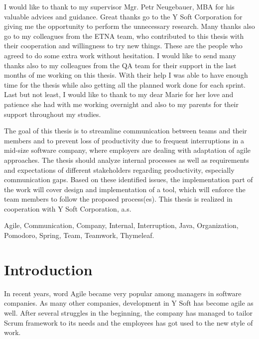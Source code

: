 \documentclass[11pt,singleside]{myfithesis2}
\begin{document}
\FrontMatter
\ThesisTitlePage
\begin{ThesisDeclaration}
\DeclarationText
\AdvisorName
\end{ThesisDeclaration}
\begin{ThesisThanks}
I would like to thank to my supervisor Mgr. Petr Neugebauer, MBA for his valuable advices and guidance. Great thanks go to the Y Soft Corporation for giving me the opportunity to perform the unnecessary research. Many thanks also go to my colleagues from the ETNA team, who contributed to this thesis with their cooperation and willingness to try new things. These are the people who agreed to do some extra work without hesitation. I would like to send many thanks also to my colleagues from the QA team for their support in the last months of me working on this thesis. With their help I was able to have enough time for the thesis while also getting all the planned work done for each sprint. Last but not least, I would like to thank to my dear Marie for her love and patience she had with me working overnight and also to my parents for their support throughout my studies. 
\end{ThesisThanks}
\begin{ThesisAbstract}
The goal of this thesis is to streamline communication between teams and their members and to prevent loss of productivity due to frequent interruptions in a mid-size software company, where employers are dealing with adaptation of agile approaches. The thesis should analyze internal processes as well as requirements and expectations of different stakeholders regarding productivity, especially communication gaps. Based on these identified issues, the implementation part of the work will cover design and implementation of a tool, which will enforce the team members to follow the proposed process(es). This thesis is realized in cooperation with Y Soft Corporation, a.s.
\end{ThesisAbstract}
\begin{ThesisKeyWords}
Agile, Communication, Company, Internal, Interruption, Java, Organization, Pomodoro, Spring, Team, Teamwork, Thymeleaf.
\end{ThesisKeyWords}
\MainMatter
\tableofcontents %

\chapter{Introduction}
In recent years, word Agile became very popular among managers in software companies. As many other companies, development in Y Soft has become agile as well. After several struggles in the beginning, the company has managed to tailor Scrum framework to its needs and the employees has got used to the new style of work.
\end{document}
